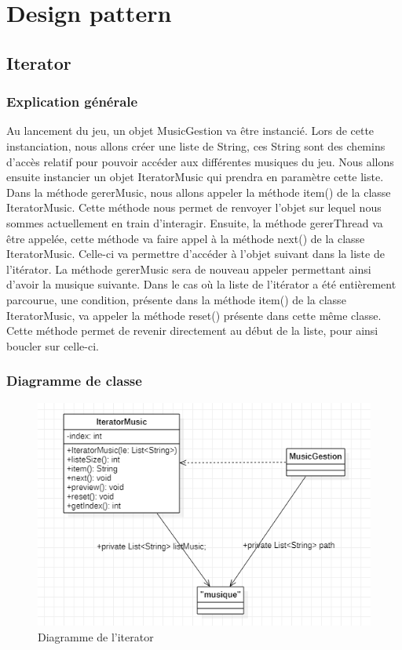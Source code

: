\newpage
\section{Design pattern}
\subsection{Iterator}

\subsubsection{Explication générale}

Au lancement du jeu, un objet MusicGestion va être instancié.
Lors de cette instanciation, nous allons créer une liste de String, ces String sont des chemins d'accès relatif pour pouvoir accéder aux différentes musiques du jeu.
Nous allons ensuite instancier un objet IteratorMusic qui prendra en paramètre cette liste.
Dans la méthode gererMusic, nous allons appeler la méthode item() de la classe IteratorMusic.
Cette méthode nous permet de renvoyer l'objet sur lequel nous sommes actuellement en train d'interagir.
Ensuite, la méthode gererThread va être appelée, cette méthode va faire appel à la méthode next() de la classe IteratorMusic.
Celle-ci va permettre d'accéder à l'objet suivant dans la liste de l'itérator.
La méthode gererMusic sera de nouveau appeler permettant ainsi d'avoir la musique suivante.
Dans le cas où la liste de l'itérator a été entièrement parcourue, une condition, présente dans la méthode item() de la classe IteratorMusic, va appeler la méthode reset() présente dans cette même classe.
Cette méthode permet de revenir directement au début de la liste, pour ainsi boucler sur celle-ci.


\subsubsection{Diagramme de classe}

\begin{figure}[h]
	\centering
	\includegraphics[width=\textwidth]{ttmc_iterator.png}
	\caption{Diagramme de l'iterator}
	\label{fig:diag_iterator}
\end{figure}

